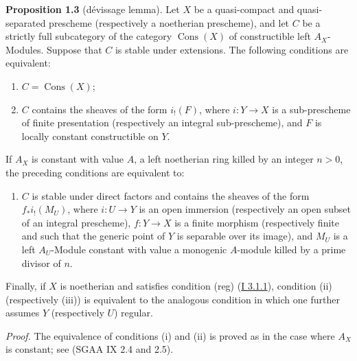 \documentclass[11pt]{article}
\providecommand{\Cons}{\operatorname{Cons}}
\begin{document}
\label{sga5:I:proposition:1.3:2}\textbf{Proposition 1.3} (dévissage lemma). Let $X$ be a quasi-compact and quasi-separated prescheme (respectively a noetherian prescheme), and let $C$ be a strictly full subcategory of the category $\Cons(X)$ of constructible left $A_X$-Modules. Suppose that $C$ is stable under extensions. The following conditions are equivalent:
\begin{enumerate}[label=(\roman*)]
\item $C=\Cons(X)$;
\item $C$ contains the sheaves of the form $i_!(F)$, where $i:Y\to X$ is a sub-prescheme of finite presentation (respectively an integral sub-prescheme), and $F$ is locally constant constructible on $Y$.
\end{enumerate}
If $A_X$ is constant with value $A$, a left noetherian ring killed by an integer $n>0$, the preceding conditions are equivalent to:
\begin{enumerate}[label=(\roman*),start=3]
\item $C$ is stable under direct factors and contains the sheaves of the form $f_*i_!(M_U)$, where $i:U\to Y$ is an open immersion (respectively an open subset of an integral prescheme), $f:Y\to X$ is a finite morphism (respectively finite and such that the generic point of $Y$ is separable over its image), and $M_U$ is a left $A_U$-Module constant with value a monogenic $A$-module killed by a prime divisor of $n$.
\end{enumerate}
Finally, if $X$ is noetherian and satisfies condition (reg) (\hyperref[sga5:I:statement:3.1.1]{I 3.1.1}), condition (ii) (respectively (iii)) is equivalent to the analogous condition in which one further assumes $Y$ (respectively $U$) regular.

\emph{Proof.} The equivalence of conditions (i) and (ii) is proved as in the case where $A_X$ is constant; see (SGAA IX 2.4 and 2.5).
\end{document}

